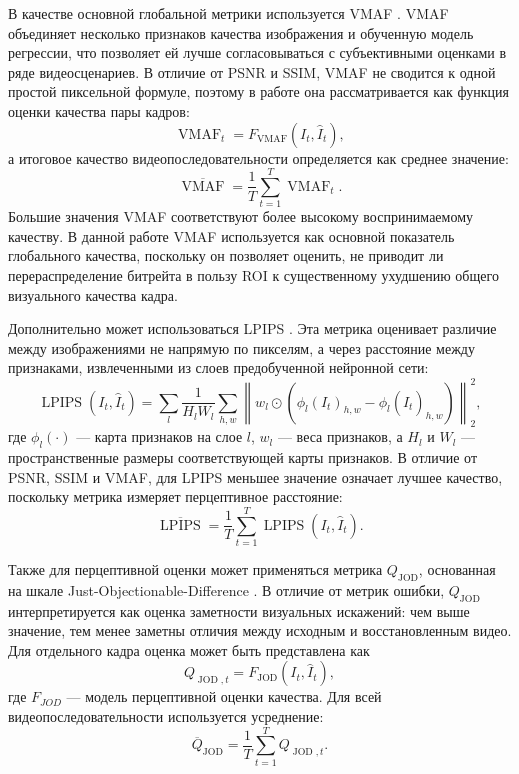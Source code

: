 \documentclass[12pt,a4paper,oneside,openany]{report}
\begin{document}
В качестве основной глобальной метрики используется VMAF \cite{vmaf}. VMAF объединяет несколько признаков качества изображения и обученную модель регрессии, что позволяет ей лучше согласовываться с субъективными оценками в ряде видеосценариев. В отличие от PSNR и SSIM, VMAF не сводится к одной простой пиксельной формуле, поэтому в работе она рассматривается как функция оценки качества пары кадров:
\begin{equation}\operatorname{VMAF}_t =F_{\operatorname{VMAF}}(I_t,\hat{I}_t),\label{eq:video_vmaf_frame}
\end{equation}а итоговое качество видеопоследовательности определяется как среднее значение:
\begin{equation}\overline{\operatorname{VMAF}}=\frac{1}{T}\sum_{t=1}^{T}\operatorname{VMAF}_t.\label{eq:video_vmaf_avg}
\end{equation}Большие значения VMAF соответствуют более высокому воспринимаемому качеству. В данной работе VMAF используется как основной показатель глобального качества, поскольку он позволяет оценить, не приводит ли перераспределение битрейта в пользу ROI к существенному ухудшению общего визуального качества кадра.

Дополнительно может использоваться LPIPS \cite{lpips}. Эта метрика оценивает различие между изображениями не напрямую по пикселям, а через расстояние между признаками, извлеченными из слоев предобученной нейронной сети:
\begin{equation}\operatorname{LPIPS}(I_t,\hat{I}_t)=\sum_l\frac{1}{H_lW_l}\sum_{h,w}\left\|w_l \odot\left(\phi_l(I_t)_{h,w} -\phi_l(\hat{I}_t)_{h,w}\right)\right\|_2^2,\label{eq:video_lpips}
\end{equation}где $\phi_l(\cdot)$ --- карта признаков на слое $l$, $w_l$ --- веса признаков, а $H_l$ и $W_l$ --- пространственные размеры соответствующей карты признаков. В отличие от PSNR, SSIM и VMAF, для LPIPS меньшее значение означает лучшее качество, поскольку метрика измеряет перцептивное расстояние:
\begin{equation}\overline{\operatorname{LPIPS}}=\frac{1}{T}\sum_{t=1}^{T}\operatorname{LPIPS}(I_t,\hat{I}_t).\label{eq:video_lpips_avg}
\end{equation}

Также для перцептивной оценки может применяться метрика $Q_{\operatorname{JOD}}$, основанная на шкале Just-Objectionable-Difference \cite{fovvideovdp}. В отличие от метрик ошибки, $Q_{\operatorname{JOD}}$ интерпретируется как оценка заметности визуальных искажений: чем выше значение, тем менее заметны отличия между исходным и восстановленным видео. Для отдельного кадра оценка может быть представлена как
\begin{equation}Q_{\operatorname{JOD},t} =F_{\operatorname{JOD}}(I_t,\hat{I}_t),\label{eq:video_qjod_frame}
\end{equation}где $F_{JOD}$ --- модель перцептивной оценки качества. Для всей видеопоследовательности используется усреднение:
\begin{equation}\overline{Q}_{\operatorname{JOD}}=\frac{1}{T}\sum_{t=1}^{T}Q_{\operatorname{JOD},t}.\label{eq:video_qjod_avg}
\end{equation}
\end{document}
